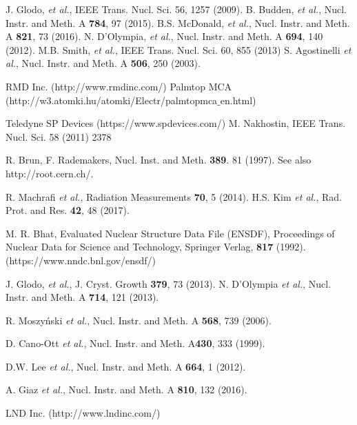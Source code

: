 \documentclass[review,number,sort&compress]{elsarticle}
\begin{document}
\begin{thebibliography}{00}

J. Glodo, {\it et al.}, IEEE Trans. Nucl. Sci. 56, 1257 (2009).
B. Budden, {\it et al.}, Nucl. Instr. and Meth. A {\bf 784}, 97 (2015).
B.S. McDonald, {\it et al.}, Nucl. Instr. and Meth. A {\bf 821}, 73 (2016).
N. D'Olympia, {\it et al.}, Nucl. Instr. and Meth. A {\bf 694}, 140 (2012).
M.B. Smith, {\it et al.}, IEEE Trans. Nucl. Sci. 60, 855 (2013)
S. Agostinelli {\it et al.}, Nucl. Instr. and Meth. A {\bf 506}, 250 (2003).

RMD Inc. (http://www.rmdinc.com/)
Palmtop MCA (http://w3.atomki.hu/atomki/Electr/palmtopmca$\_$en.html)

Teledyne SP Devices (https://www.spdevices.com/)
M. Nakhostin, IEEE Trans. Nucl. Sci. 58 (2011) 2378

R. Brun, F. Rademakers, Nucl. Inst. and Meth. {\bf 389}. 81 (1997). See also http://root.cern.ch/.

R. Machrafi {\it et al.}, Radiation Measurements {\bf 70}, 5 (2014).
H.S. Kim {\it et al.}, Rad. Prot. and Res. {\bf 42}, 48 (2017).

M. R. Bhat, Evaluated Nuclear Structure Data File (ENSDF), Proceedings of Nuclear Data for Science and Technology, Springer Verlag, {\bf 817} (1992). (https://www.nndc.bnl.gov/ensdf/)

J. Glodo, {\it et al.}, J. Cryst. Growth {\bf379}, 73 (2013).
N. D'Olympia {\it et al.}, Nucl. Instr. and Meth. A {\bf 714}, 121 (2013).

R. Moszy\'nski {\it et al.}, Nucl. Instr. and Meth. A {\bf 568}, 739 (2006).

D. Cano-Ott {\it et al.},  Nucl. Instr. and Meth. A{\bf430}, 333 (1999).

D.W. Lee {\it et al.}, Nucl. Instr. and Meth. A {\bf 664}, 1 (2012).

A. Giaz {\it et al.}, Nucl. Instr. and Meth. A {\bf 810}, 132 (2016).

LND Inc. (http://www.lndinc.com/)



\end{thebibliography}
\end{document}
